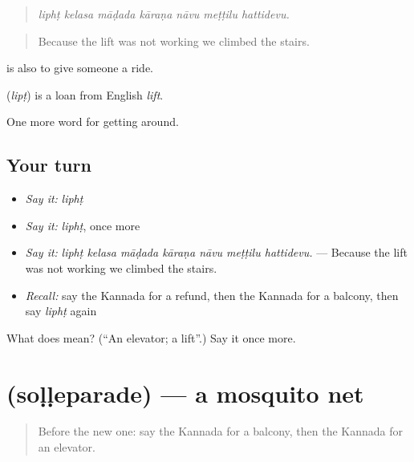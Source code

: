 \begin{quote}
\emph{liphṭ kelasa māḍada kāraṇa nāvu meṭṭilu hattidevu.}
\end{quote}

\begin{quote}
Because the lift was not working we climbed the stairs.
\end{quote}

  is also to give someone a ride.

\begin{cousinweb}
\textbf{} (\emph{lipṭ}) is a loan from English \emph{lift}.
\end{cousinweb}

\begin{grammarlens}[title={What you've built}]
One more word for getting around.
\end{grammarlens}

\subsection*{Your turn}
\begin{itemize}
\raggedright
  \item \emph{Say it:} \emph{liphṭ}
  \item \emph{Say it:} \emph{liphṭ}, once more
  \item \emph{Say it:} \emph{liphṭ kelasa māḍada kāraṇa nāvu meṭṭilu hattidevu.} — Because the lift was not working we climbed the stairs.
  \item \emph{Recall:} say the Kannada for a refund, then the Kannada for a balcony, then say \emph{liphṭ} again
\end{itemize}

\begin{tcolorbox}[breakable,colback=teal!4,colframe=teal!35!black,title={Before you move on}]
What does  mean? (\textquotedblleft{}An elevator; a lift\textquotedblright{}.) Say it once more.
\end{tcolorbox}
\section[\texorpdfstring{\kn{ಸೊಳ್ಳೆಪರದೆ} (soḷḷeparade)}{ಸೊಳ್ಳೆಪರದೆ (soḷḷeparade)}]{ (soḷḷeparade) — a mosquito net}

\label{lesson:KA-C462-solleparade}



\begin{quote}
Before the new one: say the Kannada for a balcony, then the Kannada for an elevator.
\end{quote}

